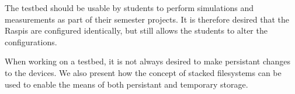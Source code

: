 




The testbed should be usable by students to perform simulations and
measurements as part of their semester projects. It is therefore desired
that the \ac{Raspi}s are configured identically, but still allows the
students to alter the configurations.

When working on a testbed, it is not always desired to make persistant
changes to the devices. We also present how the concept of stacked
filesystems can be used to enable the means of both persistant and
temporary storage.






